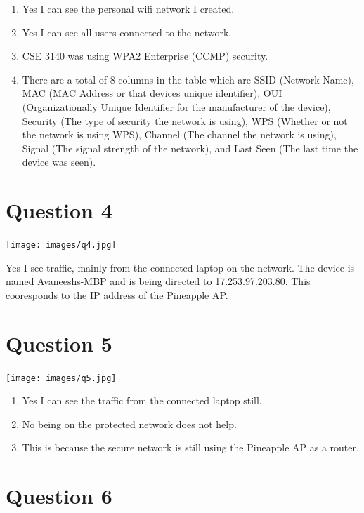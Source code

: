 \documentclass[12pt]{article}
\begin{document}
\begin{enumerate}
    \item Yes I can see the personal wifi network I created.
    \item Yes I can see all users connected to the network.
    \item CSE 3140 was using WPA2 Enterprise (CCMP) security.
    \item There are a total of 8 columns in the table which are 
    SSID (Network Name), MAC (MAC Address or that devices unique identifier), 
    OUI (Organizationally Unique Identifier for the manufacturer of the device),
    Security (The type of security the network is using), WPS (Whether or not the network is using WPS),
    Channel (The channel the network is using), Signal (The signal strength of the network),
    and Last Seen (The last time the device was seen).
\end{enumerate}

\section*{Question 4}
\begin{center}
    \texttt{[image: images/q4.jpg]}
\end{center}

Yes I see traffic, mainly from the connected laptop on the network.
The device is named Avaneeshs-MBP and is being directed to 
17.253.97.203.80. This cooresponds to the IP address of the Pineapple AP.

\section*{Question 5}
\begin{center}
    \texttt{[image: images/q5.jpg]}
\end{center}

\begin{enumerate}
    \item Yes I can see the traffic from the connected laptop still.
    \item No being on the protected network does not help.
    \item This is because the secure network is still using the Pineapple AP as a router.
\end{enumerate}

\section*{Question 6}
\end{document}
